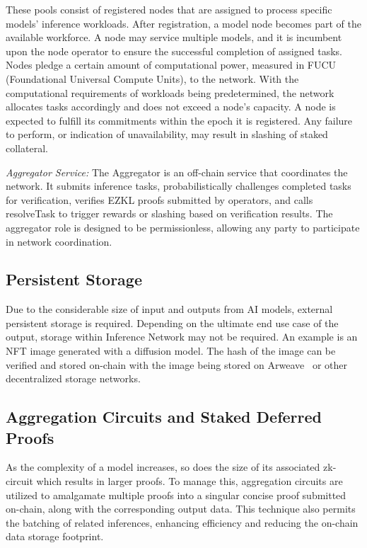 \documentclass[conference]{IEEEtran}
\begin{document}
These pools consist of registered nodes that are assigned to process specific models' inference workloads. After registration, a model node becomes part of the available workforce. A node may service multiple models, and it is incumbent upon the node operator to ensure the successful completion of assigned tasks. Nodes pledge a certain amount of computational power, measured in FUCU (Foundational Universal Compute Units), to the network. With the computational requirements of workloads being predetermined, the network allocates tasks accordingly and does not exceed a node's capacity. A node is expected to fulfill its commitments within the epoch it is registered. Any failure to perform, or indication of unavailability, may result in slashing of staked collateral.

\textit{Aggregator Service: }The Aggregator is an off-chain service that coordinates the network. It submits inference tasks, probabilistically challenges completed tasks for verification, verifies EZKL proofs submitted by operators, and calls resolveTask to trigger rewards or slashing based on verification results. The aggregator role is designed to be permissionless, allowing any party to participate in network coordination.

\subsection{Persistent Storage}

Due to the considerable size of input and outputs from AI models, external persistent storage is required. Depending on the ultimate end use case of the output, storage within Inference Network may not be required. An example is an NFT image generated with a diffusion model. The hash of the image can be verified and stored on-chain with the image being stored on Arweave~\cite{Arweave} or other decentralized storage networks.


\subsection{Aggregation Circuits and Staked Deferred Proofs}

As the complexity of a model increases, so does the size of its associated zk-circuit which results in larger proofs. To manage this, aggregation circuits are utilized to amalgamate multiple proofs into a singular concise proof submitted on-chain, along with the corresponding output data. This technique also permits the batching of related inferences, enhancing efficiency and reducing the on-chain data storage footprint.
\end{document}
